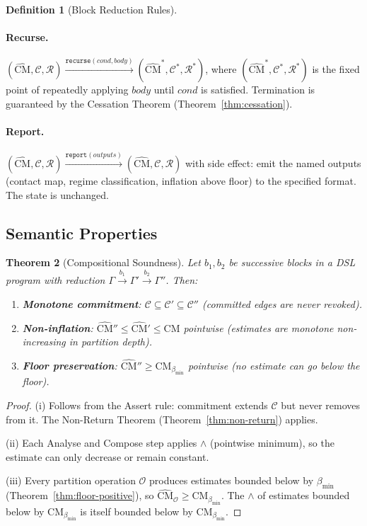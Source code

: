 \documentclass[12pt,a4paper,twocolumn]{article}
\theoremstyle{plain}
\newtheorem{theorem}{Theorem}[section]
\theoremstyle{definition}
\newtheorem{definition}[theorem]{Definition}
\theoremstyle{remark}
\newcommand{\CM}{\mathrm{CM}}
\newcommand{\bmin}{\beta_{\min}}
\newcommand{\CMbmin}{\CM_{\bmin}}
\begin{document}
\begin{definition}[Block Reduction Rules]
\paragraph{Recurse.}
$(\hat{\CM}, \mathcal{C}, \mathcal{R})
  \xrightarrow{\texttt{recurse}(\textit{cond}, \textit{body})}
  (\hat{\CM}^*, \mathcal{C}^*, \mathcal{R}^*)$,
where $(\hat{\CM}^*, \mathcal{C}^*, \mathcal{R}^*)$ is the fixed point of
repeatedly applying $\textit{body}$ until $\textit{cond}$ is satisfied.
Termination is guaranteed by the Cessation Theorem (Theorem~\ref{thm:cessation}).

\paragraph{Report.}
$(\hat{\CM}, \mathcal{C}, \mathcal{R})
  \xrightarrow{\texttt{report}(\textit{outputs})}
  (\hat{\CM}, \mathcal{C}, \mathcal{R})$
with side effect: emit the named outputs (contact map, regime classification,
inflation above floor) to the specified format.  The state is unchanged.
\end{definition}

\subsection{Semantic Properties}

\begin{theorem}[Compositional Soundness]
\label{thm:compositional}
Let $b_1, b_2$ be successive blocks in a DSL program with reduction
$\Gamma \xrightarrow{b_1} \Gamma' \xrightarrow{b_2} \Gamma''$.  Then:
\begin{enumerate}[label=(\roman*)]
  \item \textbf{Monotone commitment}: $\mathcal{C} \subseteq \mathcal{C}'
    \subseteq \mathcal{C}''$ (committed edges are never revoked).
  \item \textbf{Non-inflation}: $\hat{\CM}'' \leq \hat{\CM}' \leq \hat{\CM}$
    pointwise (estimates are monotone non-increasing in partition depth).
  \item \textbf{Floor preservation}: $\hat{\CM}'' \geq \CMbmin$ pointwise
    (no estimate can go below the floor).
\end{enumerate}
\end{theorem}

\begin{proof}
(i) Follows from the Assert rule: commitment extends $\mathcal{C}$ but never
removes from it.  The Non-Return Theorem (Theorem~\ref{thm:non-return})
applies.

(ii) Each Analyse and Compose step applies $\wedge$ (pointwise minimum),
so the estimate can only decrease or remain constant.

(iii) Every partition operation $\mathcal{O}$ produces estimates bounded
below by $\bmin$ (Theorem~\ref{thm:floor-positive}), so $\hat{\CM}_\mathcal{O}
\geq \CMbmin$.  The $\wedge$ of estimates bounded below by $\CMbmin$ is itself
bounded below by $\CMbmin$.
\end{proof}
\end{document}

